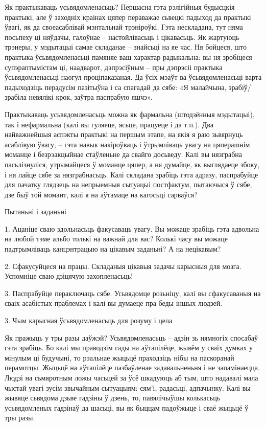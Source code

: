 Як практыкаваць усьвядомленасьць? Першасна гэта рэлігійныя будысцкія практыкі, але ў заходніх краінах цяпер пераважае сьвецкі падыход да практыкі ўвагі, як да своеасаблівай мэнтальнай трэніроўкі. Гэта нескладана, тут няма посьпеху ці няўдачы, галоўнае – настойлівасьць і цікавасьць. Як жартуюць трэнеры, у мэдытацыі самае складанае – знайсьці на яе час. Ня бойцеся, што практыка ўсьвядомленасьці памяняе ваш характар радыкальна: вы ня зробіцеся супэраптымістам ці, наадварот, дэпрэсіўным – пры дэпрэсіі практыка ўсьвядомленасьці наогул проціпаказаная. Да ўсіх мэаўт ва ўсьвядомленасьці варта падыходзіць перадусім пазітыўна і са спагадай да сябе: «Я малайчына, зрабіў/зрабіла невялікі крок, заўтра паспрабую яшчэ».

Практыкаваць усьвядомленасьць можна як фармальна (штодзённыя мэдытацыі), так і нефармальна (калі вы гуляеце, ясьце, працуеце і да т.п.). Два найважнейшыя аспэкты практыкі на першым этапе, на якія я раю зьвярнуць асаблівую ўвагу, – гэта навык накіроўваць і ўтрымліваць увагу на цяперашнім моманце і безрэакцыйнае стаўленьне да свайго досьведу. Калі вы нязграбна пасьлізнуліся, утрымайцеся ў моманце цяпер, а ня думайце, як выглядаеце збоку, і ня лайце сябе за нязграбнасьць. Калі складана зрабіць гэта адразу, паспрабуйце для пачатку глядзець на непрыемныя сытуацыі постфактум, пытаючыся ў сябе, дзе быў той момант, калі я на аўтамаце на кагосьці сарваўся?

Пытаньні і заданьні

1. Ацаніце сваю здольнасьць факусаваць увагу. Вы можаце зрабіць гэта адвольна на любой тэме альбо толькі на важнай для вас? Колькі часу вы можаце падтрымліваць канцэнтрацыю на цікавым заданьні? А на нецікавым?

2. Сфакусуйцеся на працы. Складаныя цікавыя задачы карысныя для мозга. Успомніце сваю дзіцячую захопленасьць!

3. Паспрабуйце пераключаць сябе. Усьвядомце розьніцу, калі вы сфакусаваныя на сваіх асабістых праблемах і калі вы думаеце пра беды іншых людзей.


3. Чым карысная ўсьвядомленасьць для розуму і цела

Як пражыць у тры разы даўжэй? Усьвядомленасьць – адзін зь нямногіх спосабаў гэта зрабіць. Бо калі мы праводзім гады на аўтапілёце, жывём у сваіх думках у мінулым ці будучыні, то рэальнае жыцьцё праходзіць нібы на паскоранай перамотцы. Жыцьцё на аўтапілёце пазбаўленае задавальненьня і не запамінаецца. Людзі на сьмяротным ложы часьцей за ўсё шкадуюць аб тым, што надавалі мала чыстай увагі зусім звычайным сытуацыям: сям'і, радасьці, адпачынку. Калі вы жывяце сьвядома дзьве гадзіны ў дзень, то, павялічыўшы колькасьць усьвядомленых гадзінаў да шасьці, вы як быццам падоўжыце і сваё жыцьцё ў тры разы.

